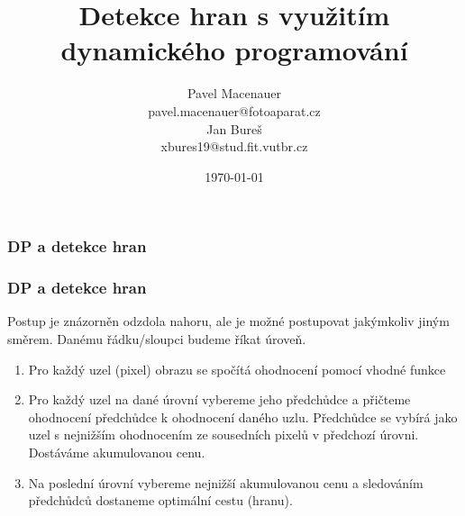 \documentclass{beamer}
\title{\large{\textbf{Detekce hran s využitím dynamického programování}}}
\author{Pavel Macenauer \\ \tiny{pavel.macenauer@fotoaparat.cz} \\ \normalsize{Jan Bureš} \\ \tiny{xbures19@stud.fit.vutbr.cz}}
\date{\tiny{\today}}
\institute[FIT VUTBR]
{
	\inst{}
	Fakulta Informačních Technologií \\
	Vysoké Učení Technické v Brně
}
\begin{document}
	\begin{frame}[t,plain]
	\titlepage

	\vspace{-7mm}
	\end{frame}


	\begin{frame}[t,fragile]
		\frametitle{DP a detekce hran}	
	\end{frame}
	

	\begin{frame}[t,fragile]
		\frametitle{DP a detekce hran}	
Postup je znázorněn odzdola nahoru, ale je možné postupovat jakýmkoliv jiným směrem. Danému řádku/sloupci budeme říkat úroveň.

		\begin{enumerate}
			\item Pro každý uzel (pixel) obrazu se spočítá ohodnocení pomocí vhodné funkce
			\item Pro každý uzel na dané úrovní vybereme jeho předchůdce a přičteme ohodnocení předchůdce k ohodnocení daného uzlu. Předchůdce se vybírá jako uzel s nejnižším ohodnocením ze sousedních pixelů v předchozí úrovni. Dostáváme akumulovanou cenu.
			\item Na poslední úrovní vybereme nejnižší akumulovanou cenu a sledováním předchůdců dostaneme optimální cestu (hranu).
		\end{enumerate}
	\end{frame}
	
	
	
\end{document}

